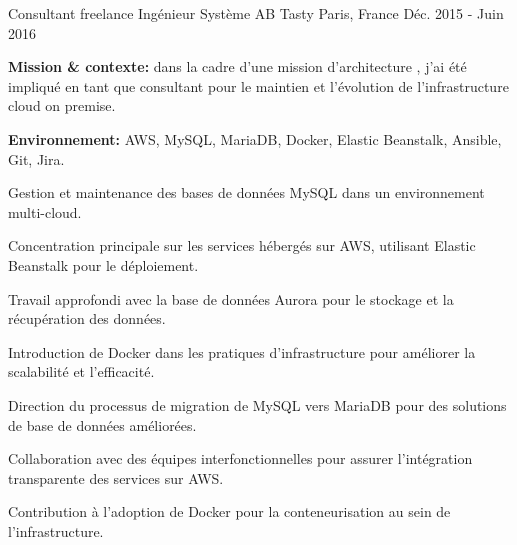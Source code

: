 \begin{cventries}
{\begin{cvitems}
{%
\cventry
{Consultant freelance Ingénieur Système} %
{AB Tasty} %
{Paris, France} %
{Déc. 2015 - Juin 2016} %
{
  \begin{cvitems} %
    \item {\textbf{Mission \& contexte:} dans la cadre d'une mission d'architecture , j'ai été impliqué en tant que consultant pour le maintien et l'évolution de l'infrastructure cloud on premise.}
    \item {\textbf{Environnement:} AWS, MySQL, MariaDB, Docker, Elastic Beanstalk, Ansible, Git, Jira.}
    \item {Gestion et maintenance des bases de données MySQL dans un environnement multi-cloud.}
    \item {Concentration principale sur les services hébergés sur AWS, utilisant Elastic Beanstalk pour le déploiement.}
    \item {Travail approfondi avec la base de données Aurora pour le stockage et la récupération des données.}
    \item {Introduction de Docker dans les pratiques d'infrastructure pour améliorer la scalabilité et l'efficacité.}
    \item {Direction du processus de migration de MySQL vers MariaDB pour des solutions de base de données améliorées.}
    \item {Collaboration avec des équipes interfonctionnelles pour assurer l'intégration transparente des services sur AWS.}
    \item {Contribution à l'adoption de Docker pour la conteneurisation au sein de l'infrastructure.}
  \end{cvitems}
}

}
\end{cvitems}}
\end{cventries}

